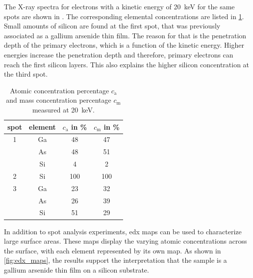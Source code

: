 The X-ray spectra for electrons with a kinetic energy of
\qty{20}{\kilo \electronvolt} for the same spots are shown
in .
The corresponding elemental concentrations are listed in
\cref{tab:edx_2}.
Small amounts of silicon are found at the first spot,
that was previously associated as a gallium arsenide thin film.
The reason for that is the penetration depth of the primary electrons,
which is a function of the kinetic energy.
Higher energies increase the penetration depth and therefore, primary
electrons can reach the first silicon layers.
This also explains the higher silicon concentration at the third spot.

\begin{table}
	\centering
	\begin{tabular}{cccc}
		\toprule
		spot & element & $c_\mathrm{a}$ in \unit{\percent } & $c_\mathrm{m}$ in \unit{\percent} \\
		\midrule
		1    & Ga      & 48                                 & 47                                \\
		     & As      & 48                                 & 51                                \\
		     & Si      & 4                                  & 2                                 \\
		\midrule
		2    & Si      & 100                                & 100                               \\
		\midrule
		3    & Ga      & 23                                 & 32                                \\
		     & As      & 26                                 & 39                                \\
		     & Si      & 51                                 & 29                                \\
		\bottomrule
	\end{tabular}
	\caption{Atomic concentration percentage $c_\mathrm{a}$ and mass
		concentration percentage $c_\mathrm{m}$ measured at
		\qty{20}{\kilo\electronvolt}.}
	\label{tab:edx_2}
\end{table}

In addition to spot analysis experiments, \ac{edx} maps can be used to
characterize large surface areas.
These maps display the varying atomic concentrations across the
surface, with each element represented by its own map.
As shown in \cref{fig:edx_maps}, the results support the
interpretation that the sample is a gallium arsenide thin film
on a silicon substrate.

